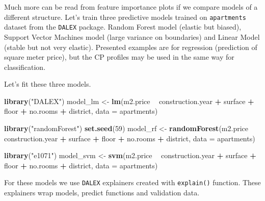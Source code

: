 \documentclass[12pt,]{krantz}
\newenvironment{Shaded}{\begin{snugshade}}{\end{snugshade}}
\newcommand{\DataTypeTok}[1]{\textcolor[rgb]{0.13,0.29,0.53}{#1}}
\newcommand{\DecValTok}[1]{\textcolor[rgb]{0.00,0.00,0.81}{#1}}
\newcommand{\KeywordTok}[1]{\textcolor[rgb]{0.13,0.29,0.53}{\textbf{#1}}}
\newcommand{\NormalTok}[1]{#1}
\newcommand{\OperatorTok}[1]{\textcolor[rgb]{0.81,0.36,0.00}{\textbf{#1}}}
\newcommand{\StringTok}[1]{\textcolor[rgb]{0.31,0.60,0.02}{#1}}
\begin{document}
Much more can be read from feature importance plots if we compare models of a different structure.
Let's train three predictive models trained on \texttt{apartments} dataset from the \texttt{DALEX} package. Random Forest model \citep{R-randomForest} (elastic but biased), Support Vector Machines model \citep{R-e1071} (large variance on boundaries) and Linear Model (stable but not very elastic).
Presented examples are for regression (prediction of square meter price), but the CP profiles may be used in the same way for classification.

Let's fit these three models.

\begin{Shaded}
\begin{Highlighting}[]
\KeywordTok{library}\NormalTok{(}\StringTok{"DALEX"}\NormalTok{)}
\NormalTok{model_lm <-}\StringTok{ }\KeywordTok{lm}\NormalTok{(m2.price }\OperatorTok{~}\StringTok{ }\NormalTok{construction.year }\OperatorTok{+}\StringTok{ }\NormalTok{surface }\OperatorTok{+}\StringTok{ }\NormalTok{floor }\OperatorTok{+}\StringTok{ }
\StringTok{                      }\NormalTok{no.rooms }\OperatorTok{+}\StringTok{ }\NormalTok{district, }\DataTypeTok{data =}\NormalTok{ apartments)}

\KeywordTok{library}\NormalTok{(}\StringTok{"randomForest"}\NormalTok{)}
\KeywordTok{set.seed}\NormalTok{(}\DecValTok{59}\NormalTok{)}
\NormalTok{model_rf <-}\StringTok{ }\KeywordTok{randomForest}\NormalTok{(m2.price }\OperatorTok{~}\StringTok{ }\NormalTok{construction.year }\OperatorTok{+}\StringTok{ }\NormalTok{surface }\OperatorTok{+}\StringTok{ }\NormalTok{floor }\OperatorTok{+}\StringTok{ }
\StringTok{                      }\NormalTok{no.rooms }\OperatorTok{+}\StringTok{ }\NormalTok{district, }\DataTypeTok{data =}\NormalTok{ apartments)}

\KeywordTok{library}\NormalTok{(}\StringTok{"e1071"}\NormalTok{)}
\NormalTok{model_svm <-}\StringTok{ }\KeywordTok{svm}\NormalTok{(m2.price }\OperatorTok{~}\StringTok{ }\NormalTok{construction.year }\OperatorTok{+}\StringTok{ }\NormalTok{surface }\OperatorTok{+}\StringTok{ }\NormalTok{floor }\OperatorTok{+}\StringTok{ }
\StringTok{                         }\NormalTok{no.rooms }\OperatorTok{+}\StringTok{ }\NormalTok{district, }\DataTypeTok{data =}\NormalTok{ apartments)}
\end{Highlighting}
\end{Shaded}

For these models we use \texttt{DALEX} explainers created with \texttt{explain()} function. These explainers wrap models, predict functions and validation data.
\end{document}
